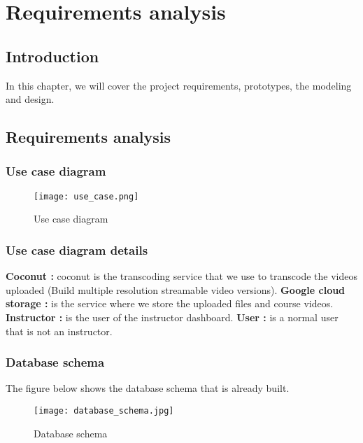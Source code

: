 \chapter{Requirements analysis}
\newpage
\section*{Introduction}
In this chapter, we will cover the project requirements, prototypes, the modeling and design.
\section{Requirements analysis}

\subsection{Use case diagram}

\begin{figure}[!ht]
    \centering
    \texttt{[image: use\_case.png]}
    \caption{Use case diagram}
    \label{fig:use_case}
\end{figure}


\subsection{Use case diagram details}
\hfill \break
\textbf{Coconut :} coconut is the transcoding service that we use to transcode the videos uploaded (Build multiple resolution streamable video versions).
\hfill \break
\textbf{Google cloud storage :} is the service where we store the uploaded files and course videos.
\hfill \break
\textbf{Instructor :} is the user of the instructor dashboard.
\hfill \break
\textbf{User :} is a normal user that is not an instructor.
 

\subsection{Database schema}

The figure below shows the database schema that is already built.

\begin{figure}[!ht]
    \centering
    \texttt{[image: database\_schema.jpg]}
    \caption{Database schema}
    \label{fig:database_schema}
\end{figure}


